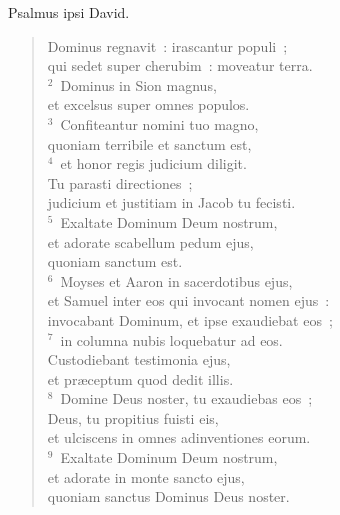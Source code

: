 \bchapter
\lettrine[lines=3,image=true,loversize=0.05,lraise=-0.03]{P}{}salmus ipsi David. \begin{flushleft}\begin{verse}\vspace{6pt}Dominus regnavit~: irascantur populi~;\\ qui sedet super cherubim~: moveatur terra.\\
${}^{2}$~Dominus in Sion magnus,\\ et excelsus super omnes populos.\\
${}^{3}$~Confiteantur nomini tuo magno,\\ quoniam terribile et sanctum est,\\
${}^{4}$~et honor regis judicium diligit.\\ Tu parasti directiones~;\\ judicium et justitiam in Jacob tu fecisti.\\
${}^{5}$~Exaltate Dominum Deum nostrum,\\ et adorate scabellum pedum ejus,\\ quoniam sanctum est.\\
${}^{6}$~Moyses et Aaron in sacerdotibus ejus,\\ et Samuel inter eos qui invocant nomen ejus~:\\ invocabant Dominum, et ipse exaudiebat eos~;\\
${}^{7}$~in columna nubis loquebatur ad eos.\\ Custodiebant testimonia ejus,\\ et pr\ae ceptum quod dedit illis.\\
${}^{8}$~Domine Deus noster, tu exaudiebas eos~;\\ Deus, tu propitius fuisti eis,\\ et ulciscens in omnes adinventiones eorum.\\
${}^{9}$~Exaltate Dominum Deum nostrum,\\ et adorate in monte sancto ejus,\\ quoniam sanctus Dominus Deus noster.\end{verse}\end{flushleft}



